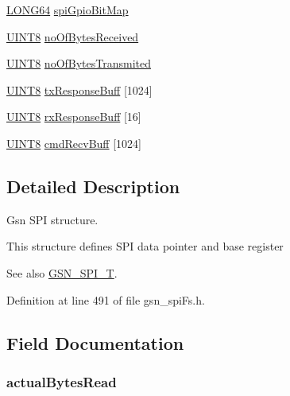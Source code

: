 \begin{DoxyCompactItemize}
\item 
\hyperlink{a00660_gae57305825c7d329ad8a3065ae045e875}{LONG64} \hyperlink{a00232_a0b3967ea299cf8eb236778533abc97be}{spiGpioBitMap}
\item 
\hyperlink{a00660_gab27e9918b538ce9d8ca692479b375b6a}{UINT8} \hyperlink{a00232_a99212c0c53a159d243003e1846ca8f37}{noOfBytesReceived}
\item 
\hyperlink{a00660_gab27e9918b538ce9d8ca692479b375b6a}{UINT8} \hyperlink{a00232_acf2761ea7cf5dbf36810885481f39bfd}{noOfBytesTransmited}
\item 
\hyperlink{a00660_gab27e9918b538ce9d8ca692479b375b6a}{UINT8} \hyperlink{a00232_a418903feeb7dca190e9d0c667f19c719}{txResponseBuff} \mbox{[}1024\mbox{]}
\item 
\hyperlink{a00660_gab27e9918b538ce9d8ca692479b375b6a}{UINT8} \hyperlink{a00232_a23328d3d0e3aab44af0e3800694657d8}{rxResponseBuff} \mbox{[}16\mbox{]}
\item 
\hyperlink{a00660_gab27e9918b538ce9d8ca692479b375b6a}{UINT8} \hyperlink{a00232_a3243c706791a4fef4156fb465c41dc42}{cmdRecvBuff} \mbox{[}1024\mbox{]}
\end{DoxyCompactItemize}


\subsection{Detailed Description}
Gsn SPI structure. 

This structure defines SPI data pointer and base register

\begin{DoxySeeAlso}{See also}
\hyperlink{a00655_ga18a5a1252fa65289699c9caa71d05fca}{GSN\_\-SPI\_\-T}. 
\end{DoxySeeAlso}


Definition at line 491 of file gsn\_\-spiFs.h.



\subsection{Field Documentation}
\hypertarget{a00232_aa458a81c4cc5863c64abf7dac4d6a497}{
\subsubsection[{actualBytesRead}]{ {\bf actualBytesRead}}}
\label{a00232_aa458a81c4cc5863c64abf7dac4d6a497}


